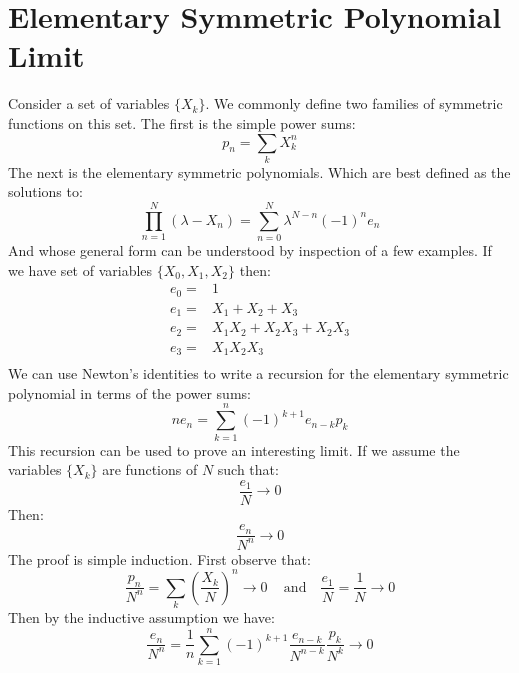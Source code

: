 
\section{Elementary Symmetric Polynomial Limit}
\label{misc:elementary_symmetric_polynomial_limit}
Consider a set of variables $\{X_k\}$.
We commonly define two families of symmetric functions on this set.
The first is the simple power sums:
\[p_n = \sum_{k}X_k^n\]
The next is the elementary symmetric polynomials.
Which are best defined as the solutions to:
\[\prod_{n=1}^{N}(\lambda -X_n) = \sum_{n=0}^{N}\lambda^{N-n}(-1)^ne_n\]
And whose general form can be understood by inspection of a few examples.
If we have set of variables $\{X_0,X_1,X_2\}$ then:
\begin{equation*}
\begin{aligned}
	e_0 =& 1\\
	e_1 =& X_1 +X_2 +X_3\\
	e_2 =& X_1X_2 +X_2X_3 +X_2X_3 \\
	e_3 =& X_1X_2X_3 \\
\end{aligned}
\end{equation*}
We can use Newton's identities to write a recursion for the elementary symmetric polynomial in terms of the power sums:
\[ne_n = \sum_{k=1}^n(-1)^{k+1}e_{n-k}p_k\]
This recursion can be used to prove an interesting limit.
If we assume the variables $\{X_k\}$ are functions of $N$ such that:
\[\frac{e_1}{N} \rightarrow 0\]
Then:
\[\frac{e_n}{N^n} \rightarrow 0\]
The proof is simple induction.
First observe that:
\[\frac{p_n}{N^n} = \sum_k\left(\frac{X_k}{N}\right)^n\rightarrow 0\,\quad\text{and}\quad\frac{e_1}{N}=\frac{1}{N}\rightarrow0\]
Then by the inductive assumption we have:
\[\frac{e_n}{N^n} = \frac{1}{n}\sum_{k=1}^n(-1)^{k+1}\frac{e_{n-k}}{N^{n-k}}\frac{p_k}{N^k}\rightarrow0\]
